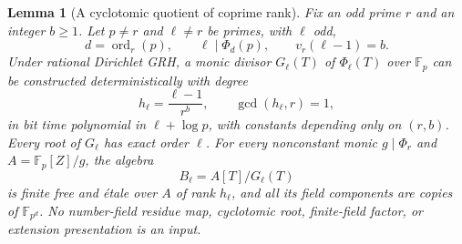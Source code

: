\documentclass[11pt]{article}
\newtheorem{lemma}[theorem]{Lemma}
\theoremstyle{definition}
\theoremstyle{remark}
\begin{document}
\begin{lemma}[A cyclotomic quotient of coprime rank]
\label{lem:cyclotomic-primary-quotient}
Fix an odd prime $r$ and an integer $b\geq1$.
Let $p\ne r$ and $\ell\ne r$ be primes, with $\ell$ odd,
\[
 d=\operatorname{ord}_r(p),\qquad
 \ell\mid\Phi_d(p),\qquad v_r(\ell-1)=b.
\]
Under rational Dirichlet GRH, a monic divisor $G_\ell(T)$ of
$\Phi_\ell(T)$ over $\mathbb F_p$ can be constructed deterministically
with degree
\[
 h_\ell=\frac{\ell-1}{r^b},\qquad \gcd(h_\ell,r)=1,
\]
in bit time polynomial in $\ell+\log p$, with constants depending only on
$(r,b)$.  Every root of $G_\ell$ has exact order $\ell$.
For every nonconstant monic $g\mid\Phi_r$ and
$A=\mathbb F_p[Z]/g$, the algebra
\[
 B_\ell=A[T]/G_\ell(T)
\]
is finite free and \'etale over $A$ of rank $h_\ell$, and all its field
components are copies of $\mathbb F_{p^d}$.
No number-field residue map, cyclotomic root, finite-field factor, or
extension presentation is an input.
\end{lemma}
\end{document}
